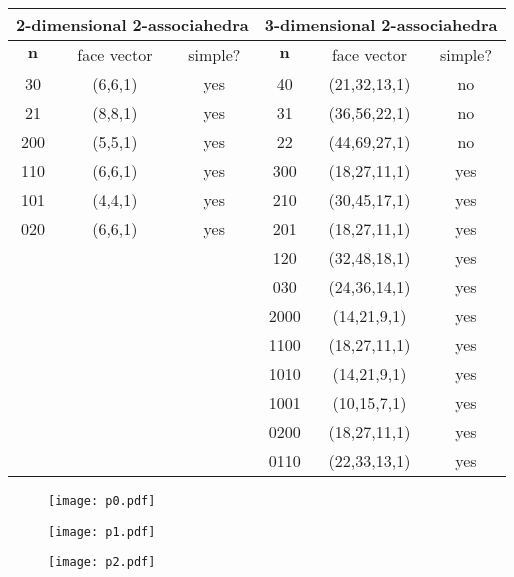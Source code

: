 \documentclass[11pt]{amsart}
\theoremstyle{definition}
\theoremstyle{remark}
\theoremstyle{plain}
\newcommand\bn{\mathbf{n}}
\begin{document}
\bigskip

\begin{center}
\begin{tabular}{|c|c|c||c|c|c|}
\hline
\multicolumn{3}{|c||}{2-dimensional 2-associahedra} & \multicolumn{3}{|c|}{3-dimensional 2-associahedra} \\
\hline
$\bn$ & face vector & simple? & $\bn$ & face vector & simple? \\
\hline
30 & (6,6,1) & yes & 40 & (21,32,13,1) & no \\
\hline
21 & (8,8,1) & yes & 31 & (36,56,22,1) & no \\
\hline
200 & (5,5,1) & yes & 22 & (44,69,27,1) & no \\
\hline
110 & (6,6,1) & yes & 300 & (18,27,11,1) & yes \\
\hline
101 & (4,4,1) & yes & 210 & (30,45,17,1) & yes \\
\hline
020 & (6,6,1) & yes & 201 & (18,27,11,1) & yes \\
\hline
\multicolumn{3}{|c||}{} & 120 & (32,48,18,1) & yes \\
\hline
\multicolumn{3}{|c||}{} & 030 & (24,36,14,1) & yes \\
\hline
\multicolumn{3}{|c||}{} & 2000 & (14,21,9,1) & yes \\
\hline
\multicolumn{3}{|c||}{} & 1100 & (18,27,11,1) & yes \\
\hline
\multicolumn{3}{|c||}{} & 1010 & (14,21,9,1) & yes \\
\hline
\multicolumn{3}{|c||}{} & 1001 & (10,15,7,1) & yes \\
\hline
\multicolumn{3}{|c||}{} & 0200 & (18,27,11,1) & yes \\
\hline
\multicolumn{3}{|c||}{} & 0110 & (22,33,13,1) & yes \\
\hline
\end{tabular}
\end{center}

\newpage

\begin{figure}[H]
\centering
\texttt{[image: p0.pdf]}
\end{figure}

\newpage

\begin{figure}[H]
\centering
\texttt{[image: p1.pdf]}
\end{figure}

\newpage

\begin{figure}[H]
\centering
\texttt{[image: p2.pdf]}
\end{figure}
\end{document}
